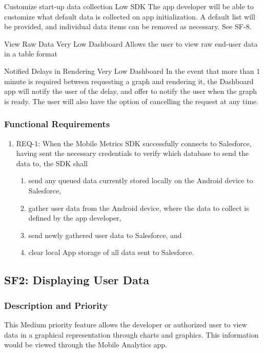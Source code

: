 \documentclass[12pt,oneside,letterpaper]{article}
\begin{document}
{Customize start-up data collection}
{Low}
{SDK}
{The app developer will be able to customize what default data is collected on app initialization. A default list will be provided, and individual data items can be removed as necessary. See SF-8.}

{View Raw Data}
{Very Low}
{Dashboard}
{Allows the user to view raw end-user data in a table format}

{Notified Delays in Rendering}
{Very Low}
{Dashboard}
{In the event that more than 1 minute is required between requesting a graph and rendering it, the Dashboard app will notify the user of the delay, and offer to notify the user when the graph is ready. The user will also have the option of cancelling the request at any time.}


\subsubsection{Functional Requirements}
\begin{enumerate}
\item REQ-1: When the Mobile Metrics SDK successfully connects to Salesforce, having sent the necessary credentials to verify which database to send the data to, the SDK shall
\begin{enumerate}
\item send any queued data currently stored locally on the Android device to Salesforce,
\item gather user data from the Android device, where the data to collect is defined by the app developer,
\item send newly gathered user data to Salesforce, and
\item clear local App storage of all data sent to Salesforce.
\end{enumerate} 
\end{enumerate}

\subsection{SF2: Displaying User Data}
\subsubsection{Description and Priority}
This Medium priority feature allows the developer or authorized user to view data in a graphical representation through charts and graphics. This information would be viewed through the Mobile Analytics app.
\end{document}

